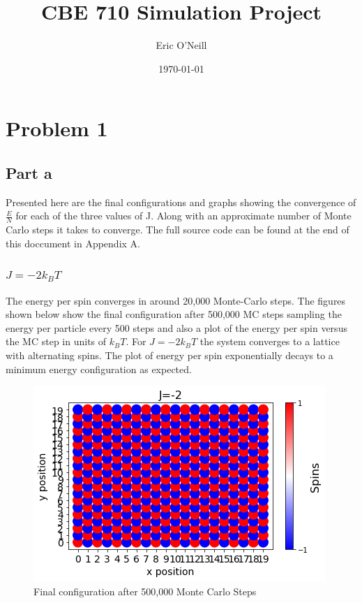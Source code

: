 \documentclass{article}
\title{CBE 710 Simulation Project}
\author{Eric O'Neill}
\date{\today}
\begin{document}
 
\maketitle
 
\section*{Problem 1}
 
\subsection*{Part a}
Presented here are the final configurations and graphs showing the convergence of $\frac{E}{N}$ for each of the three values of J. Along with an approximate number of Monte Carlo steps it takes to converge. The full source code can be found at the end of this doccument in Appendix A.
	\subsubsection*{$J = -2k_BT$}

	The energy per spin converges in around 20,000 Monte-Carlo steps. The figures shown below show the final configuration after 500,000 MC steps sampling the energy per particle every 500 steps and also a plot of the energy per spin versus the MC step in units of $k_BT$. For $J=-2k_BT$ the system converges to a lattice with alternating spins. The plot of energy per spin exponentially decays to a minimum energy configuration as expected. 


	\begin{figure}[H]
		\centering
		\includegraphics[scale=0.75]{J=-2}
		\caption{Final configuration after 500,000 Monte Carlo Steps}
	\end{figure}
\end{document}
